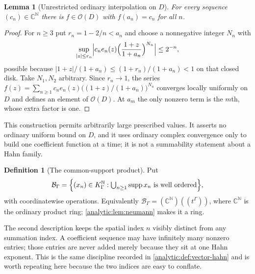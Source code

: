 \documentclass[11pt,letterpaper]{article}
\newtheorem{lemma}[theorem]{Lemma}
\theoremstyle{definition}
\newtheorem{definition}[theorem]{Definition}
\theoremstyle{remark}
\newcommand{\C}{\mathbb C}
\newcommand{\N}{\mathbb N}
\newcommand{\BB}{\mathcal B}
\newcommand{\OO}{\mathcal O}
\newcommand{\supp}{\operatorname{supp}}
\numberwithin{equation}{section}
\begin{document}
\begin{lemma}[Unrestricted ordinary interpolation on $D$]
\label{analytic:lem:fixed-interp}
For every sequence $(c_n)\in\C^\N$ there is $f\in\OO(D)$ with $f(a_n)=c_n$
for all $n$.
\end{lemma}
\begin{proof}
For $n\ge3$ put $r_n=1-2/n<a_n$ and choose a nonnegative integer $N_n$ with
\[
 \sup_{|z|\le r_n}
 \Bigl|c_ne_n(z)\Bigl(\frac{1+z}{1+a_n}\Bigr)^{N_n}\Bigr|\le2^{-n},
\]
possible because $|1+z|/(1+a_n)\le(1+r_n)/(1+a_n)<1$ on that closed disk.
Take $N_1,N_2$ arbitrary. Since $r_n\to1$, the series
$f(z)=\sum_{n\ge1}c_ne_n(z)\bigl((1+z)/(1+a_n)\bigr)^{N_n}$ converges
locally uniformly on $D$ and defines an element of $\OO(D)$. At $a_m$ the
only nonzero term is the $m$th, whose extra factor is one.
\end{proof}

This construction permits arbitrarily large prescribed values. It asserts
no ordinary uniform bound on $D$, and it uses ordinary complex convergence
only to build one coefficient function at a time; it is not a
summability statement about a Hahn family.

\begin{definition}[The common-support product]\label{analytic:def:fixed-B}
Put
\begin{equation}\label{analytic:eq:fixed-Bdef}
 \BB_\Gamma=\Bigl\{(x_n)\in K_\Gamma^\N:
 \textstyle\bigcup_{n\ge1}\supp x_n\ \text{is well ordered}\Bigr\},
\end{equation}
with coordinatewise operations. Equivalently
$\BB_\Gamma=(\C^\N)((t^\Gamma))$, where $\C^\N$ is the ordinary product
ring; \cref{analytic:lem:neumann} makes it a ring.
\end{definition}

The second description keeps the spatial index $n$ visibly distinct from
any summation index. A coefficient sequence may have infinitely many
nonzero entries; those entries are never added merely because they sit at
one Hahn exponent. This is the same discipline recorded in
\cref{analytic:def:vector-hahn} and is worth repeating here because the two
indices are easy to conflate.
\end{document}
